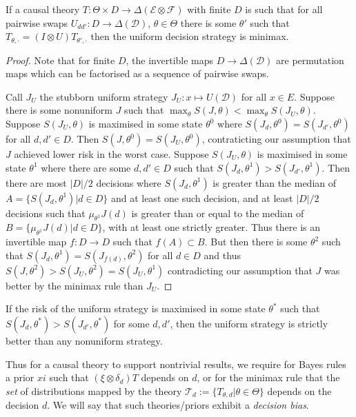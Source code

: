 \begin{theorem}
If a causal theory $T:\Theta\times D\to \Delta(\mathcal{E}\otimes\mathcal{F})$ with finite $D$ is such that for all pairwise swaps $U_{dd'}:D\to \Delta(\mathcal{D})$, $\theta\in \Theta$ there is some $\theta'$ such that $T_{\theta,\cdot} = (I\otimes U)T_{\theta',\cdot}$ then the uniform decision strategy is minimax.
\end{theorem}

\begin{proof}
Note that for finite $D$, the invertible maps $D\to \Delta(\mathcal{D})$ are permutation maps which can be factorised as a sequence of pairwise swaps.

Call $J_U$ the stubborn uniform strategy $J_U:x\mapsto U(\mathcal{D})$ for all $x\in E$. Suppose there is some nonuniform $J$ such that $\max_\theta S(J,\theta) < \max_\theta S(J_U,\theta)$. Suppose $S(J_U,\theta)$ is maximised in some state $\theta^0$ where $S(J_d,\theta^0)=S(J_{d'},\theta^0)$ for all $d,d'\in D$. Then $S(J,\theta^0)=S(J_U,\theta^0)$, contraticting our assumption that $J$ achieved lower risk in the worst case. Suppose $S(J_U,\theta)$ is maximised in some state $\theta^1$ where there are some $d,d'\in D$ such that $S(J_d,\theta^1)>S(J_{d'},\theta^1)$. Then there are most $|D|/2$ decisions where $S(J_d,\theta^1)$ is greater than the median of $A=\{S(J_d,\theta^1)|d\in D\}$ and at least one such decision, and at least $|D|/2$ decisions such that $\mu_{\theta^1} J(d)$ is greater than or equal to the median of $B=\{\mu_{\theta^1} J(d)|d\in D\}$, with at least one strictly greater. Thus there is an invertible map $f:D\to D$ such that $f(A)\subset B$. But then there is some $\theta^2$ such that $S(J_d,\theta^1)=S(J_{f(d)},\theta^2)$ for all $d\in D$ and thus $S(J,\theta^2)> S(J_U,\theta^2) = S(J_U,\theta^1)$ contradicting our assumption that $J$ was better by the minimax rule than $J_U$.
\end{proof}

\begin{corollary}
If the risk of the uniform strategy is maximised in some state $\theta^*$ such that $S(J_d,\theta^*)>S(J_{d'},\theta^*)$ for some $d,d'$, then the uniform strategy is strictly better than any nonuniform strategy.
\end{corollary}

Thus for a causal theory to support nontrivial results, we require for Bayes rules a prior $xi$ such that $(\xi\otimes \delta_d)T$ depends on $d$, or for the minimax rule that the \emph{set} of distributions mapped by the theory $\mathscr{T}_d:=\{T_{\theta,d}|\theta\in\Theta\}$ depends on the decision $d$. We will say that such theories/priors exhibit a \emph{decision bias}. 

